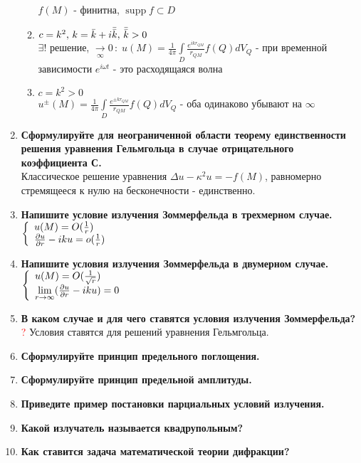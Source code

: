 \begin{enumerate}[label=\textbf{\underline{\arabic*.}}]
\begin{enumerate}
            $f(M)$ - финитна, $ \operatorname{supp}f \subset D $\\
      \item $c=k^2,\,k=\bar{k}+i\bar{\bar{k}},\,\bar{\bar{k}}>0 $\\
            $\exists !$ решение, $\xrightarrow[\infty]{}0\,:\;
            u(M) = \frac{1}{4\pi}\int\limits_D\frac{e^{ikr_{QM}}}{r_{QM}}f(Q)dV_Q $ -
            при временной зависимости $e^{i\omega t}$ - это расходящаяся волна
      \item $c=k^2>0 $\\
            $u^\pm(M) = \frac{1}{4\pi}\int\limits_D\frac{e^{\pm kr_{QM}}}{r_{QM}}f(Q)dV_Q $ -
            оба одинаково убывают на $\infty$
      \end{enumerate}
\item \textbf{Сформулируйте для неограниченной области теорему единственности решения уравнения Гельмгольца в случае отрицательного коэффициента С.}\\
      Классическое решение уравнения $\Delta u -\kappa^2 u = -f(M)$, равномерно стремящееся к нулю на бесконечности - единственно.
\item \textbf{Напишите условие излучения Зоммерфельда в трехмерном случае.}\\
      $\left\{\begin{array}{l}
            u(M)=O(\frac{1}{r})\\
            \frac{\partial u}{\partial r}-iku=o(\frac{1}{r})
      \end{array}\right.$
\item \textbf{Напишите условия излучения Зоммерфельда в двумерном случае.}\\
      $\left\{\begin{array}{l}
            u(M)=O(\frac{1}{\sqrt{r}})\\
            \lim\limits_{r\to\infty}(\frac{\partial u}{\partial r}-iku)=0
      \end{array}\right.$
\item \textbf{В каком случае и для чего ставятся условия излучения Зоммерфельда?}
      \textcolor{red}{?}  Условия ставятся для решений уравнения Гельмгольца.
\item \textbf{Сформулируйте принцип предельного поглощения.}
\item \textbf{Сформулируйте принцип предельной амплитуды.}
\item \textbf{Приведите пример постановки парциальных условий излучения.}
\item \textbf{Какой излучатель называется квадрупольным?}
\item \textbf{Как ставится задача математической теории дифракции?}\\

\end{enumerate}
